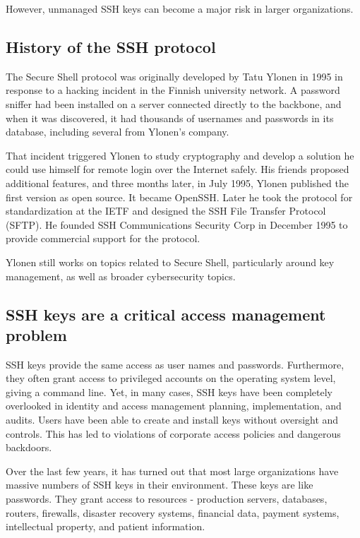 \documentclass{article}
\begin{document}
However, unmanaged SSH keys can become a major risk in larger organizations.




\subsection{History of the SSH protocol}
The Secure Shell protocol was originally developed by Tatu Ylonen in 1995 in response to a hacking incident in the Finnish university network. A password sniffer had been installed on a server connected directly to the backbone, and when it was discovered, it had thousands of usernames and passwords in its database, including several from Ylonen's company.

That incident triggered Ylonen to study cryptography and develop a solution he could use himself for remote login over the Internet safely. His friends proposed additional features, and three months later, in July 1995, Ylonen published the first version as open source. It became OpenSSH. Later he took the protocol for standardization at the IETF and designed the SSH File Transfer Protocol (SFTP). He founded SSH Communications Security Corp in December 1995 to provide commercial support for the protocol.

Ylonen still works on topics related to Secure Shell, particularly around key management, as well as broader cybersecurity topics.

\subsection{SSH keys are a critical access management problem}
SSH keys provide the same access as user names and passwords. Furthermore, they often grant access to privileged accounts on the operating system level, giving a command line. Yet, in many cases, SSH keys have been completely overlooked in identity and access management planning, implementation, and audits. Users have been able to create and install keys without oversight and controls. This has led to violations of corporate access policies and dangerous backdoors.

Over the last few years, it has turned out that most large organizations have massive numbers of SSH keys in their environment. These keys are like passwords. They grant access to resources - production servers, databases, routers, firewalls, disaster recovery systems, financial data, payment systems, intellectual property, and patient information.
\end{document}
